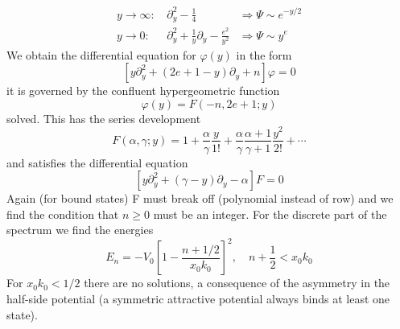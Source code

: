 \begin{equation}
\begin{aligned} 
y \rightarrow \infty: &\,\partial_{y}^{2}-\frac{1}{4}  &\Rightarrow \Psi \sim e^{-y / 2} \\ y \rightarrow 0:&\, \partial_{y}^{2}+\frac{1}{y} \partial_{y}-\frac{e^{2}}{y^{2}}  &\Rightarrow \Psi \sim y^{e} \end{aligned}
\end{equation}
We obtain the differential equation for $\varphi(y)$ in the form
\begin{equation}
    \left[y \partial_{y}^{2}+(2 e+1-y) \partial_{y}+n\right] \varphi=0
    \end{equation}
it is governed by the confluent hypergeometric function
\begin{equation}
    \varphi(y)=F(-n, 2 e+1 ; y)
    \end{equation}
solved. This has the series development
\begin{equation}
    F(\alpha, \gamma ; y)=1+\frac{\alpha}{\gamma} \frac{y}{1 !}+\frac{\alpha}{\gamma} \frac{\alpha+1}{\gamma+1} \frac{y^{2}}{2 !}+\cdots
    \end{equation}
and satisfies the differential equation
\begin{equation}
    \left[y \partial_{y}^{2}+(\gamma-y) \partial_{y}-\alpha\right] F=0
    \end{equation}
Again (for bound states) F must break off (polynomial instead of row) and we find the condition that $n \geq 0$ must be an integer. For the discrete part of the spectrum we find the energies
\begin{equation}
    E_{n}=-V_{0}\left[1-\frac{n+1 / 2}{x_{0} k_{0}}\right]^{2}, \quad n+\frac{1}{2}<x_{0} k_{0}
    \end{equation}
For $x_0k_0 <1/2$ there are no solutions, a consequence of the asymmetry in the half-side potential (a symmetric attractive potential always binds at least one state).
